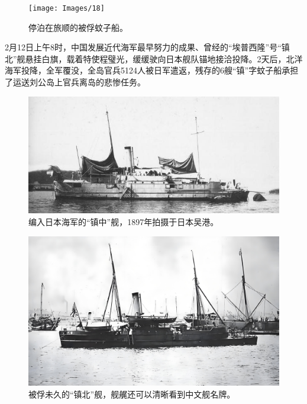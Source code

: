 \documentclass[12pt,UTF8]{ctexbook}
\begin{document}
\begin{figure}[htbp]
	\centering
	\texttt{[image: Images/18]}
	\caption{停泊在旅顺的被俘蚊子船。}
	\label{fig:1}
\end{figure}

2月12日上午8时，中国发展近代海军最早努力的成果、曾经的“埃普西隆”号“镇北”舰悬挂白旗，载着特使程璧光，缓缓驶向日本舰队锚地接洽投降。2天后，北洋海军投降，全军覆没，全岛官兵5124人被日军遣返，残存的6艘“镇”字蚊子船承担了运送刘公岛上官兵离岛的悲惨任务。

\begin{figure}[htbp]
	\centering
	\includegraphics[width=1\linewidth]{Images/19}
	\caption{编入日本海军的“镇中”舰，1897年拍摄于日本吴港。}
	\label{fig:1}
\end{figure}

\begin{figure}[htbp]
	\centering
	\includegraphics[width=1\linewidth]{Images/20}
	\caption{被俘未久的“镇北”舰，舰艉还可以清晰看到中文舰名牌。}
	\label{fig:1}
\end{figure}
\end{document}

